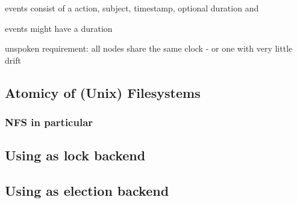 events consist of a action, subject, timestamp, optional duration and 

events might have a duration

unspoken requirement: all nodes share the same clock - or one with very little drift

\subsection{Atomicy of (Unix) Filesystems}

\subsubsection{NFS in particular}

\subsection{Using as lock backend}

\subsection{Using as election backend}